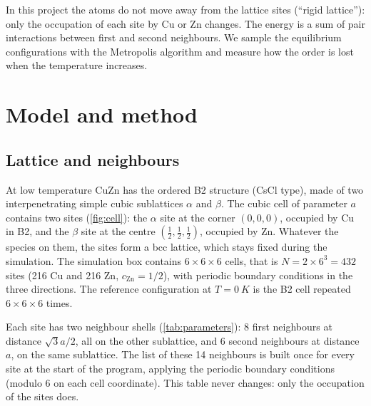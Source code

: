 \documentclass[11pt,a4paper]{article}
\newcommand{\Zn}{\mathrm{Zn}}
\begin{document}
In this project the atoms do not move away from the lattice sites (\enquote{rigid lattice}): only the occupation of each site by Cu or Zn changes.
The energy is a sum of pair interactions between first and second neighbours.
We sample the equilibrium configurations with the Metropolis algorithm and measure how the order is lost when the temperature increases.

\section{Model and method}
\label{sec:model}

\subsection{Lattice and neighbours}

At low temperature CuZn has the ordered B2 structure (CsCl type), made of two interpenetrating simple cubic sublattices $\alpha$ and $\beta$.
The cubic cell of parameter $a$ contains two sites (\cref{fig:cell}): the $\alpha$ site at the corner $(0,0,0)$, occupied by Cu in B2, and the $\beta$ site at the centre $(\frac12,\frac12,\frac12)$, occupied by Zn.
Whatever the species on them, the sites form a bcc lattice, which stays fixed during the simulation.
The simulation box contains $6\times6\times6$ cells, that is $N = 2\times 6^3 = 432$ sites (216 Cu and 216 Zn, $c_\Zn=1/2$), with periodic boundary conditions in the three directions.
The reference configuration at $T=\SI{0}{K}$ is the B2 cell repeated $6\times6\times6$ times.

Each site has two neighbour shells (\cref{tab:parameters}): 8 first neighbours at distance $\sqrt{3}a/2$, all on the other sublattice, and 6 second neighbours at distance $a$, on the same sublattice.
The list of these 14 neighbours is built once for every site at the start of the program, applying the periodic boundary conditions (modulo 6 on each cell coordinate).
This table never changes: only the occupation of the sites does.
\end{document}
